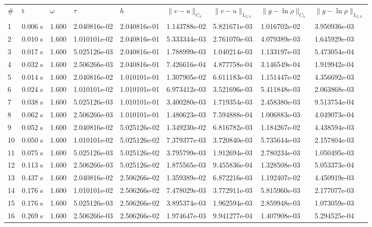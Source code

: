 \documentclass[12pt]{article}
\begin{document}
\begin{center}
\begin{tabular}{lllllllll}
\# & t & $\omega$ & $\tau$ & $h$ & $\|v - u\|_{C_h}$ & $\|v - u\|_{L_{2,h}}$ & $\|g - \ln\rho\|_{C_h}$ & $\|g - \ln\rho\|_{L_{2,h}}$ \\

1&      0.006 s&      1.600&      2.040816e-02&      2.040816e-01&      1.143788e-02&      5.821671e-03&      1.016702e-02&      3.950936e-03\\
2&      0.010 s&      1.600&      1.010101e-02&      2.040816e-01&      5.333344e-03&      2.761070e-03&      4.079389e-03&      1.645929e-03\\
3&      0.017 s&      1.600&      5.025126e-03&      2.040816e-01&      1.788999e-03&      1.040214e-03&      1.133197e-03&      5.473054e-04\\
4&      0.032 s&      1.600&      2.506266e-03&      2.040816e-01&      7.426616e-04&      4.877758e-04&      3.146549e-04&      1.919942e-04\\
5&      0.014 s&      1.600&      2.040816e-02&      1.010101e-01&      1.307905e-02&      6.611183e-03&      1.151447e-02&      4.356692e-03\\
6&      0.024 s&      1.600&      1.010101e-02&      1.010101e-01&      6.973412e-03&      3.521696e-03&      5.411848e-03&      2.063868e-03\\
7&      0.038 s&      1.600&      5.025126e-03&      1.010101e-01&      3.400280e-03&      1.719354e-03&      2.458380e-03&      9.513754e-04\\
8&      0.062 s&      1.600&      2.506266e-03&      1.010101e-01&      1.480623e-03&      7.594888e-04&      1.006883e-03&      4.049073e-04\\
9&      0.052 s&      1.600&      2.040816e-02&      5.025126e-02&      1.349230e-02&      6.816782e-03&      1.184267e-02&      4.438594e-03\\
10&      0.050 s&      1.600&      1.010101e-02&      5.025126e-02&      7.379377e-03&      3.720840e-03&      5.735644e-03&      2.157804e-03\\
11&      0.075 s&      1.600&      5.025126e-03&      5.025126e-02&      3.795799e-03&      1.912694e-03&      2.780234e-03&      1.050495e-03\\
12&      0.113 s&      1.600&      2.506266e-03&      5.025126e-02&      1.875565e-03&      9.455836e-04&      1.328508e-03&      5.053373e-04\\
13&      0.437 s&      1.600&      2.040816e-02&      2.506266e-02&      1.359389e-02&      6.872216e-03&      1.192407e-02&      4.450919e-03\\
14&      0.176 s&      1.600&      1.010101e-02&      2.506266e-02&      7.478029e-03&      3.772911e-03&      5.815960e-03&      2.177077e-03\\
15&      0.176 s&      1.600&      5.025126e-03&      2.506266e-02&      3.895374e-03&      1.962594e-03&      2.859948e-03&      1.073059e-03\\
16&      0.269 s&      1.600&      2.506266e-03&      2.506266e-02&      1.974647e-03&      9.941277e-04&      1.407908e-03&      5.294525e-04\\
\end{tabular}
\end{center}
\end{document}
